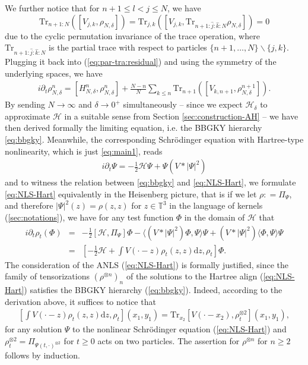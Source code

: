 We further notice that for $n + 1 \leqslant l < j \leqslant N$, we have
\[ \mathrm{Tr}_{n + 1 : N}  \left([V_{j, k}, \rho_{N, \delta}]\right) = \mathrm{Tr}_{j, k}
    \left([V_{j, k}, \mathrm{Tr}_{n + 1 : \hat{j} : \hat{k} : N} \rho_{N, \delta}]\right) =
   0 \]
due to the cyclic permutation invariance of the trace operation, where
$\mathrm{Tr}_{n + 1 : \hat{j} : \hat{k} : N} $ is the partial trace with respect
to particles $\{ n + 1, \ldots, N \} \backslash \{ j, k \}$. Plugging it back
into (\ref{eq:par-tra:residual}) and using the symmetry of the underlying
spaces, we have
\begin{align}\label{eq:schrodinger-hierarchy}
  i \partial_t \rho_{N, \delta}^n = [H^n_{N, \delta}, \rho^n_{N, \delta}]
    + \frac{N - n}{N} \sum_{k \leqslant n} \mathrm{Tr}_{n + 1}  \left([V_{k, n + 1},
    \rho^{n + 1}_{N, \delta}]\right). 
\end{align}
By sending $N \rightarrow \infty$ and $\delta \rightarrow 0^+$
simultaneously -- since we expect $\mathcal{H}_{\delta}$ to approximate $\mathcal{H}$ in a suitable sense from Section \ref{sec:construction-AH} -- we
have then derived formally the limiting equation, i.e. the BBGKY hierarchy \eqref{eq:bbgky}. Meanwhile, the corresponding Schr{\"o}dinger equation with Hartree-type
nonlinearity, which is just \eqref{eq:main1}, reads
\begin{align}\label{eq:NLS-Hart}
  i \partial_t \Psi = - \frac{1}{2} \mathcal{H} \Psi + \Psi (V \ast | \Psi
  |^2) 
\end{align}
and to witness the relation between \eqref{eq:bbgky} and \eqref{eq:NLS-Hart},
we formulate \eqref{eq:NLS-Hart} equivalently in the Heisenberg picture, that
is if we let $\rho : = \Pi_{\Psi}$, and therefore $| \Psi |^2 (z) = \rho (z,
z)$ for $z \in \mathbb{T}^3$ in the language of kernels (\ref{sec:notations}),
we have for any test function $\Phi$ in the domain of $\mathcal{H}$ that
\begin{eqnarray}
  i \partial_t \rho_t (\Phi) & = & - \frac{1}{2} [\mathcal{H}, \Pi_{\Psi}]
  \Phi - \langle (V \ast | \Psi |^2) \Phi, \Psi \rangle \Psi + (V \ast | \Psi
  |^2) \langle \Phi, \Psi \rangle \Psi \nonumber\\
  & = & \left[ - \frac{1}{2} \mathcal{H} + \int V (\cdot - z) \rho_t (z, z)
  \mathrm{d} z, \rho_t \right] \Phi . \label{eq:ANLS-soln-bbgky} 
\end{eqnarray}
The consideration of the ANLS (\ref{eq:NLS-Hart}) is formally
justified, since the family of tensorizations $(\rho^{\otimes n})_n$ of the
solutions to the Hartree align (\ref{eq:NLS-Hart}) satisfies the BBGKY
hierarchy (\ref{eq:bbgky}). Indeed, according to the derivation above, it
suffices to notice that
\begin{align}
  \left[ \int V (\cdot - z) \rho_t (z, z) \mathrm{d} z, \rho_t \right] (x_1, y_1)
  = \mathrm{Tr}_{x_2} [V (\cdot - x_2), \rho^{\otimes 2}_t] (x_1, y_1),
  \label{eq:Vr,r=trVr2}
\end{align}
for any solution $\Psi$ to the nonlinear Schr{\"o}dinger equation
(\ref{eq:NLS-Hart}) and $\rho^{\otimes 2}_t = \Pi_{\Psi (t, \cdot)^{\otimes
2}}$ for $t \geqslant 0$ acts on two particles. The assertion for
$\rho^{\otimes n}$ for $n \geqslant 2$ follows by induction.

